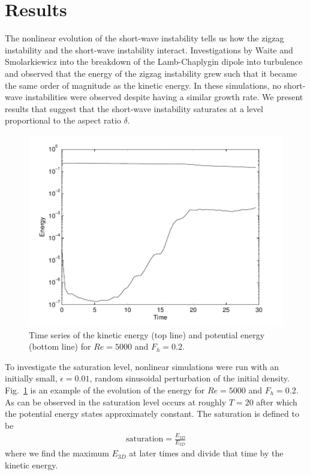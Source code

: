 \section{Results}
The nonlinear evolution of the short-wave instability tells us how the zigzag instability and the short-wave instability interact. Investigations by Waite and Smolarkiewicz into the breakdown of the Lamb-Chaplygin dipole into turbulence and observed that the energy of the zigzag instability grew such that it became the same order of magnitude as the kinetic energy. In these simulations, no short-wave instabilities were observed despite having a similar growth rate. We present results that suggest that the short-wave instability saturates at a level proportional to the aspect ratio $\delta$.
\begin{figure}
\begin{center}
\includegraphics[width=\textwidth]{sat_eg_re5000_fh02}
\caption{Time series of the kinetic energy (top line) and potential energy (bottom line) for $Re=5000$ and $F_{h}=0.2$.}
\label{sat_energy}
\end{center}
\end{figure}

To investigate the saturation level, nonlinear simulations were run with an initially small, $\epsilon=0.01$, random sinusoidal perturbation of the initial density. Fig.~\ref{sat_energy} is an example of the evolution of the energy for $Re=5000$ and $F_{h}=0.2$. As can be observed in the saturation level occurs at roughly $T=20$ after which the potential energy states approximately constant. The saturation is defined to be
\begin{align}
\text{saturation} = \frac{E_{3D}}{E_{2D}}
\end{align}
where we find the maximum $E_{3D}$ at later times and divide that time by the kinetic energy. 

